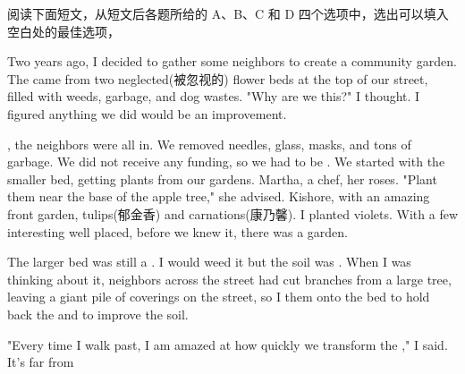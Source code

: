 \documentclass{英语试卷}
\begin{document}
\par 阅读下面短文，从短文后各题所给的 A、B、C 和 D 四个选项中，选出可以填入空白处的最佳选项，\par
\par Two years ago, I decided to gather some neighbors to create a community garden. The  came from two neglected(被忽视的) flower beds at the top of our street, filled with weeds, garbage, and dog wastes. "Why are we  this?" I thought. I figured anything we did would be an improvement.\par
\par {}, the neighbors were all in. We removed needles, glass, masks, and tons of garbage. We did not receive any funding, so we had to be . We started with the smaller bed, getting plants from our gardens. Martha, a chef,  her roses. "Plant them near the base of the apple tree," she advised. Kishore, with an amazing front garden,  tulips(郁金香) and carnations(康乃馨). I planted violets. With a few interesting  well placed, before we knew it, there was a garden.\par
\par The larger bed was still a . I would weed it but the soil was . When I was thinking about  it, neighbors across the street had cut branches from a large tree, leaving a giant pile of coverings on the street, so I  them onto the bed to hold back the  and to improve the soil.\par
\par "Every time I walk past, I am amazed at how quickly we transform the ," I said. It's far from \par
{}
\end{document}
